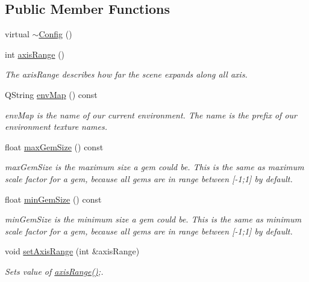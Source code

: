 \subsection*{Public Member Functions}
\begin{DoxyCompactItemize}
\item 
virtual \hyperlink{class_config_a543dce59b66475c5108088ee4ce1cdfc}{$\sim$\+Config} ()
\item 
int \hyperlink{class_config_a17e5e932c588503e186f40c2bcff3149}{axis\+Range} ()
\begin{DoxyCompactList}\small\item\em The axis\+Range describes how far the scene expands along all axis. \end{DoxyCompactList}\item 
Q\+String \hyperlink{class_config_ada50183c56178ba20a6d91193901434e}{env\+Map} () const 
\begin{DoxyCompactList}\small\item\em env\+Map is the name of our current environment. The name is the prefix of our environment texture names. \end{DoxyCompactList}\item 
float \hyperlink{class_config_a55adaaba8e9105c2047f485fc1ff737e}{max\+Gem\+Size} () const 
\begin{DoxyCompactList}\small\item\em max\+Gem\+Size is the maximum size a gem could be.  This is the same as maximum scale factor for a gem, because all gems are in range between \mbox{[}-\/1;1\mbox{]} by default. \end{DoxyCompactList}\item 
float \hyperlink{class_config_af5183a4e104ff4d86f112359199a861f}{min\+Gem\+Size} () const 
\begin{DoxyCompactList}\small\item\em min\+Gem\+Size is the minimum size a gem could be.  This is the same as minimum scale factor for a gem, because all gems are in range between \mbox{[}-\/1;1\mbox{]} by default. \end{DoxyCompactList}\item 
void \hyperlink{class_config_ab6e130f2988e1ee72e81e853865708ba}{set\+Axis\+Range} (int \&axis\+Range)
\begin{DoxyCompactList}\small\item\em Sets value of \hyperlink{class_config_a17e5e932c588503e186f40c2bcff3149}{axis\+Range()};. \end{DoxyCompactList}\item 

\end{DoxyCompactItemize}
